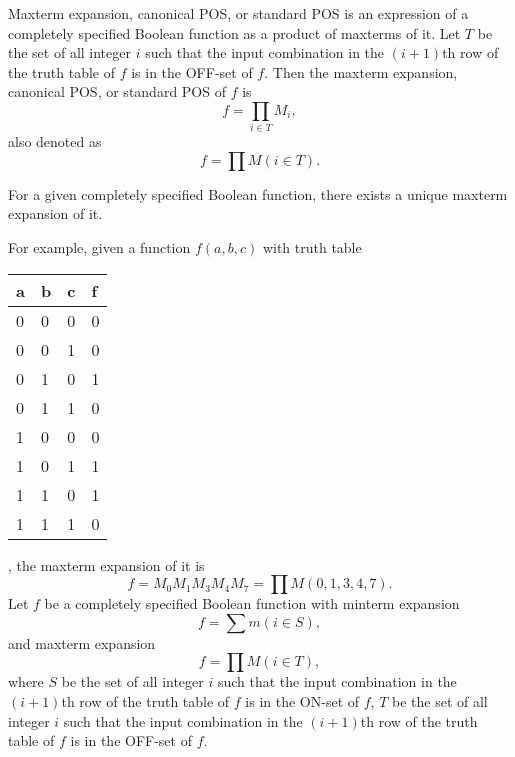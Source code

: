 \documentclass[a4paper,12pt]{article}
\begin{document}
\begin{itemize}
\begin{itemize}
\begin{itemize}
\begin{itemize}
\begin{itemize}
\begin{itemize}
\begin{itemize}
Maxterm expansion, canonical POS, or standard POS is an expression of a completely specified Boolean function as a product of maxterms of it. Let $T$ be the set of all integer $i$ such that the input combination in the $(i+1)$th row of the truth table of $f$ is in the OFF-set of $f$. Then the maxterm expansion, canonical POS, or standard POS of $f$ is
\[f=\prod_{i\in T}M_i,\]
also denoted as 
\[f=\prod M(i\in T).\]

For a given completely specified Boolean function, there exists a unique maxterm expansion of it.

For example, given a function $f(a,b,c)$ with truth table
\begin{longtable}[c]{|m|m|m|m|}
\hline
a & b & c & f\\\hline
0 & 0 & 0 & 0\\\hline
0 & 0 & 1 & 0\\\hline
0 & 1 & 0 & 1\\\hline
0 & 1 & 1 & 0\\\hline
1 & 0 & 0 & 0\\\hline
1 & 0 & 1 & 1\\\hline
1 & 1 & 0 & 1\\\hline
1 & 1 & 1 & 0\\\hline
\end{longtable}
, the maxterm expansion of it is
\[f=M_0M_1M_3M_4M_7=\prod M(0,1,3,4,7).\]
Let $f$ be a completely specified Boolean function with minterm expansion
\[f=\sum m(i\in S),\]
and maxterm expansion
\[f=\prod M(i\in T),\]
where $S$ be the set of all integer $i$ such that the input combination in the $(i+1)$th row of the truth table of $f$ is in the ON-set of $f$, $T$ be the set of all integer $i$ such that the input combination in the $(i+1)$th row of the truth table of $f$ is in the OFF-set of $f$.


\end{itemize}
\end{itemize}
\end{itemize}
\end{itemize}
\end{itemize}
\end{itemize}
\end{itemize}
\end{document}
